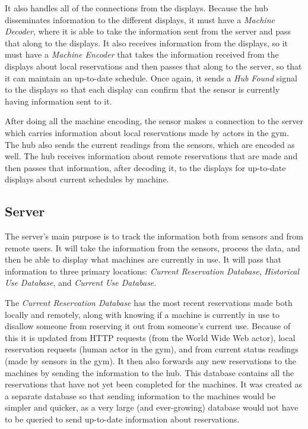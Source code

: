 \documentclass[PPFS.tex]{template/subfiles}
\begin{document}
It also handles all of the connections from the displays. Because the hub disseminates information to the different displays, it must have a \textit{Machine Decoder}, where it is able to take the information sent from the server and pass that along to the displays. It also receives information from the displays, so it must have a \textit{Machine Encoder} that takes the information received from the displays about local reservations and then passes that along to the server, so that it can maintain an up-to-date schedule. Once again, it sends a \textit{Hub Found} signal to the displays so that each display can confirm that the sensor is currently having information sent to it.

After doing all the machine encoding, the sensor makes a connection to the server which carries information about local reservations made by actors in the gym. The hub also sends the current readings from the sensors, which are encoded as well. The hub receives information about remote reservations that are made and then passes that information, after decoding it, to the displays for up-to-date displays about current schedules by machine.

\subsection{Server}

The server's main purpose is to track the information both from sensors and from remote users. It will take the information from the sensors, process the data, and then be able to display what machines are currently in use. It will pass that information to three primary locations: \textit{Current Reservation Database}, \textit{Historical Use Database}, and \textit{Current Use Database}.

The \textit{Current Reservation Database} has the most recent reservations made both locally and remotely, along with knowing if a machine is currently in use to disallow someone from reserving it out from someone's current use. Because of this it is updated from HTTP requests (from the World Wide Web actor), local reservation requests (human actor in the gym), and from current status readings (made by sensors in the gym). It then also forwards any new reservations to the machines by sending the information to the hub. This database contains all the reservations that have not yet been completed for the machines. It was created as a separate database so that sending information to the machines would be simpler and quicker, as a very large (and ever-growing) database would not have to be queried to send up-to-date information about reservations.
\end{document}
